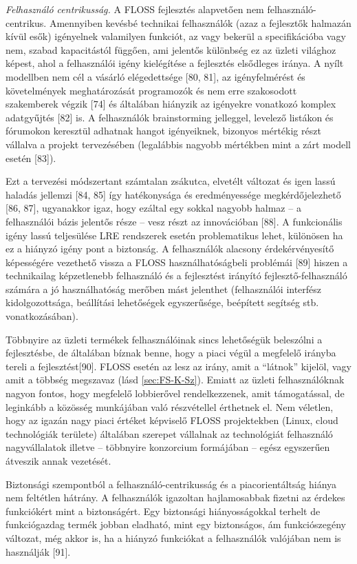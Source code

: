 \documentclass[12pt,magyar,a4paper,oneside]{scrreprt}
\begin{document}
\emph{Felhasználó centrikusság.} A FLOSS fejlesztés alapvetően nem
felhasználó-centrikus. Amennyiben kevésbé technikai felhasználók (azaz a
fejlesztők halmazán kívül esők) igényelnek valamilyen funkciót, az vagy
bekerül a specifikációba vagy nem, szabad kapacitástól függően, ami
jelentős különbség ez az üzleti világhoz képest, ahol a felhasználói
igény kielégítése a fejlesztés elsődleges iránya. A nyílt modellben nem
cél a vásárló elégedettsége {[}80, 81{]}, az igényfelmérést és
követelmények meghatározását programozók és nem erre szakosodott
szakemberek végzik {[}74{]} és általában hiányzik az igényekre vonatkozó
komplex adatgyűjtés {[}82{]} is. A felhasználók brainstorming jelleggel,
levelező listákon és fórumokon keresztül adhatnak hangot igényeiknek,
bizonyos mértékig részt vállalva a projekt tervezésében (legalábbis
nagyobb mértékben mint a zárt modell esetén {[}83{]}).

Ezt a tervezési módszertant számtalan zsákutca, elvetélt változat és
igen lassú haladás jellemzi {[}84, 85{]} így hatékonysága és
eredményessége megkérdőjelezhető {[}86, 87{]}, ugyanakkor igaz, hogy
ezáltal egy sokkal nagyobb halmaz -- a felhasználói bázis jelentős része
-- vesz részt az innovációban {[}88{]}. A funkcionális igény lassú
teljesülése LRE rendszerek esetén problematikus lehet, különösen ha ez a
hiányzó igény pont a biztonság. A felhasználók alacsony érdekérvényesítő
képességére vezethető vissza a FLOSS használhatóságbeli problémái
{[}89{]} hiszen a technikailag képzetlenebb felhasználó és a fejlesztést
irányító fejlesztő-felhasználó számára a jó használhatóság merőben mást
jelenthet (felhasználói interfész kidolgozottsága, beállítási
lehetőségek egyszerűsége, beépített segítség stb. vonatkozásában).

Többnyire az üzleti termékek felhasználóinak sincs lehetőségük
beleszólni a fejlesztésbe, de általában bíznak benne, hogy a piaci végül
a megfelelő irányba tereli a fejlesztést{[}90{]}. FLOSS esetén az lesz
az irány, amit a ``látnok'' kijelöl, vagy amit a többség megszavaz (lásd
\ref{sec:FS-K-Sz}). Emiatt az üzleti felhasználóknak nagyon fontos, hogy
megfelelő lobbierővel rendelkezzenek, amit támogatással, de leginkább a
közösség munkájában való részvétellel érthetnek el. Nem véletlen, hogy
az igazán nagy piaci értéket képviselő FLOSS projektekben (Linux, cloud
technológiák területe) általában szerepet vállalnak az technológiát
felhasználó nagyvállalatok illetve -- többnyire konzorcium formájában --
egész egyszerűen átveszik annak vezetését.

Biztonsági szempontból a felhasználó-centrikusság és a piacorientáltság
hiánya nem feltétlen hátrány. A felhasználók igazoltan hajlamosabbak
fizetni az érdekes funkciókért mint a biztonságért. Egy biztonsági
hiányosságokkal terhelt de funkciógazdag termék jobban eladható, mint
egy biztonságos, ám funkciószegény változat, még akkor is, ha a hiányzó
funkciókat a felhasználók valójában nem is használják {[}91{]}.
\end{document}
